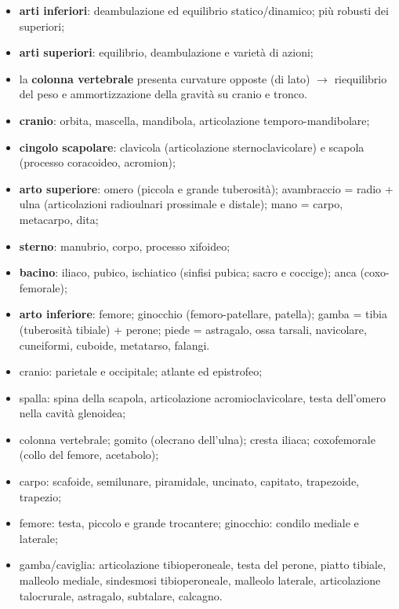 \begin{itemize}
  \item \textbf{arti inferiori}: deambulazione ed equilibrio statico/dinamico; più robusti dei
    superiori;
  \item \textbf{arti superiori}: equilibrio, deambulazione e varietà di azioni;
  \item la \textbf{colonna vertebrale} presenta curvature opposte (di lato) $\rightarrow$
    riequilibrio del peso e ammortizzazione della gravità su cranio e tronco.
\end{itemize}

\begin{itemize}
  \item \textbf{cranio}: orbita, mascella, mandibola, articolazione temporo-mandibolare;
  \item \textbf{cingolo scapolare}: clavicola (articolazione sternoclavicolare) e scapola (processo
    coracoideo, acromion);
  \item \textbf{arto superiore}: omero (piccola e grande tuberosità); avambraccio = radio + ulna
    (articolazioni radioulnari prossimale e distale); mano = carpo, metacarpo, dita;
  \item \textbf{sterno}: manubrio, corpo, processo xifoideo;
  \item \textbf{bacino}: iliaco, pubico, ischiatico (sinfisi pubica; sacro e coccige); anca
    (coxo-femorale);
  \item \textbf{arto inferiore}: femore; ginocchio (femoro-patellare, patella); gamba = tibia
    (tuberosità tibiale) + perone; piede = astragalo, ossa tarsali, navicolare, cuneiformi, cuboide,
    metatarso, falangi.
\end{itemize}

\begin{itemize}
  \item cranio: parietale e occipitale; atlante ed epistrofeo;
  \item spalla: spina della scapola, articolazione acromioclavicolare, testa dell'omero nella
    cavità glenoidea;
  \item colonna vertebrale; gomito (olecrano dell'ulna); cresta iliaca; coxofemorale (collo del
    femore, acetabolo);
  \item carpo: scafoide, semilunare, piramidale, uncinato, capitato, trapezoide, trapezio;
  \item femore: testa, piccolo e grande trocantere; ginocchio: condilo mediale e laterale;
  \item gamba/caviglia: articolazione tibioperoneale, testa del perone, piatto tibiale, malleolo
    mediale, sindesmosi tibioperoneale, malleolo laterale, articolazione talocrurale, astragalo,
    subtalare, calcagno.
\end{itemize}

